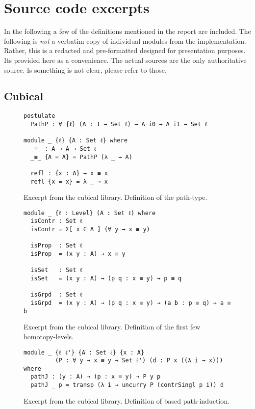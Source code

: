 \chapter{Source code excerpts}
\label{ch:app-sources}
In the following a few of the definitions mentioned in the report are included.
The following is \emph{not} a verbatim copy of individual modules from the
implementation. Rather, this is a redacted and pre-formatted designed for
presentation purposes. Its provided here as a convenience. The actual sources
are the only authoritative source. Is something is not clear, please refer to
those.
\section{Cubical}
\label{sec:app-cubical}
\begin{figure}[h]
\label{fig:path}
\begin{Verbatim}
postulate
  PathP : ∀ {ℓ} (A : I → Set ℓ) → A i0 → A i1 → Set ℓ

module _ {ℓ} {A : Set ℓ} where
  _≡_ : A → A → Set ℓ
  _≡_ {A = A} = PathP (λ _ → A)

  refl : {x : A} → x ≡ x
  refl {x = x} = λ _ → x
\end{Verbatim}
\caption{Excerpt from the cubical library. Definition of the path-type.}
\end{figure}
\clearpage
%
\begin{figure}[h]
\begin{Verbatim}
module _ {ℓ : Level} (A : Set ℓ) where
  isContr : Set ℓ
  isContr = Σ[ x ∈ A ] (∀ y → x ≡ y)

  isProp  : Set ℓ
  isProp  = (x y : A) → x ≡ y

  isSet   : Set ℓ
  isSet   = (x y : A) → (p q : x ≡ y) → p ≡ q

  isGrpd  : Set ℓ
  isGrpd  = (x y : A) → (p q : x ≡ y) → (a b : p ≡ q) → a ≡ b
\end{Verbatim}
\caption{Excerpt from the cubical library. Definition of the first few
  homotopy-levels.}
\end{figure}
%
\begin{figure}[h]
\begin{Verbatim}
module _ {ℓ ℓ'} {A : Set ℓ} {x : A}
         (P : ∀ y → x ≡ y → Set ℓ') (d : P x ((λ i → x))) where
  pathJ : (y : A) → (p : x ≡ y) → P y p
  pathJ _ p = transp (λ i → uncurry P (contrSingl p i)) d
\end{Verbatim}
\clearpage
\caption{Excerpt from the cubical library. Definition of based path-induction.}
\end{figure}
